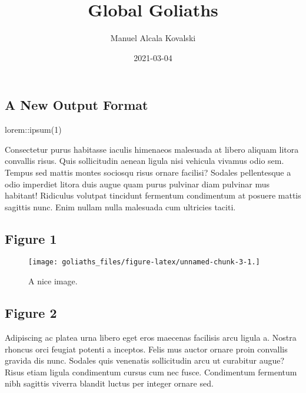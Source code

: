 \documentclass[
]{article}
\title{Global Goliaths}
\author{Manuel Alcala Kovalski}
\date{2021-03-04}
\newenvironment{Shaded}{\begin{snugshade}}{\end{snugshade}}
\newcommand{\DecValTok}[1]{\textcolor[rgb]{0.00,0.00,0.81}{#1}}
\newcommand{\FunctionTok}[1]{\textcolor[rgb]{0.00,0.00,0.00}{#1}}
\newcommand{\NormalTok}[1]{#1}
\newcommand{\SpecialCharTok}[1]{\textcolor[rgb]{0.00,0.00,0.00}{#1}}
\begin{document}
\maketitle

\hypertarget{a-new-output-format}{%
\subsection{A New Output Format}\label{a-new-output-format}}

\begin{Shaded}
\begin{Highlighting}[]
\NormalTok{lorem}\SpecialCharTok{::}\FunctionTok{ipsum}\NormalTok{(}\DecValTok{1}\NormalTok{)}
\end{Highlighting}
\end{Shaded}

Consectetur purus habitasse iaculis himenaeos malesuada at libero
aliquam litora convallis risus. Quis sollicitudin aenean ligula nisi
vehicula vivamus odio sem. Tempus sed mattis montes sociosqu risus
ornare facilisi? Sodales pellentesque a odio imperdiet litora duis augue
quam purus pulvinar diam pulvinar mus habitant! Ridiculus volutpat
tincidunt fermentum condimentum at posuere mattis sagittis nunc. Enim
nullam nulla malesuada cum ultricies taciti.

\hypertarget{figure-1}{%
\subsection{Figure 1}\label{figure-1}}

\begin{figure}
\texttt{[image: goliaths\_files/figure-latex/unnamed-chunk-3-1.]} \caption{A nice image.}\label{fig:unnamed-chunk-3}
\end{figure}

\hypertarget{figure-2}{%
\subsection{Figure 2}\label{figure-2}}

Adipiscing ac platea urna libero eget eros maecenas facilisis arcu
ligula a. Nostra rhoncus orci feugiat potenti a inceptos. Felis mus
auctor ornare proin convallis gravida dis nunc. Sodales quis venenatis
sollicitudin arcu ut curabitur augue? Risus etiam ligula condimentum
cursus cum nec fusce. Condimentum fermentum nibh sagittis viverra
blandit luctus per integer ornare sed.
\end{document}

